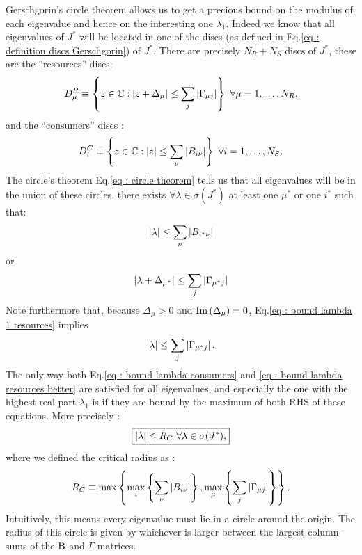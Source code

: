 \documentclass[12pt, titlepage]{report}
\begin{document}
Gerschgorin's circle theorem allows us to get a precious bound on the modulus of each eigenvalue and hence on the interesting one $\lambda_1$. Indeed we know that all eigenvalues of $J^*$ will be located in one of the discs (as defined in Eq.\eqref{eq : definition discs Gerschgorin}) of $J^*$. There are precisely $N_R + N_S$ discs of $J^*$, these are the ``resources'' discs:
\begin{equation}
D^R_\mu  \equiv \left\{ z \in \mathbb{C} : \left|{z+\Delta_\mu}\right| \leq \sum_j \left|{\Gamma_{\mu j}}\right| \right\}  \ \forall \mu = 1, \dots, N_R,
\end{equation}
and the ``consumers'' discs :
\begin{equation}
D^C_i \equiv \left\{ z \in \mathbb{C} : \left|{z}\right| \leq \sum_\nu \left|{B_{i\nu}}\right|\right\} \ \forall i=1, \dots, N_S.
\end{equation}
The circle's theorem Eq.\eqref{eq : circle theorem} tells us that all eigenvalues will be in the union of these circles, \ie there exists $\forall \lambda \in \sigma\left(J^*\right)$ at least one $\mu^*$ or  one $i^*$ such that:
\begin{equation}
\left|{\lambda}\right| \leq \sum_\nu \left|{B_{i^*\nu}}\right| \label{eq : bound lambda consumers}
\end{equation}
or
\begin{equation}
\left|{\lambda+\Delta_{\mu^*}}\right| \leq \sum_j \left|{\Gamma_{\mu^* j}}\right| \label{eq : bound lambda 1 resources}
\end{equation}
Note furthermore that, because $\Delta_\mu > 0$ and $\text{Im}\left(\Delta_\mu\right)=0$, Eq.\eqref{eq : bound lambda 1 resources} implies
\begin{equation}
\left|{\lambda}\right| \leq \sum_j \left|{\Gamma_{\mu^* j}}\right|. \label{eq : bound lambda resources better}
\end{equation}
The only way both Eq.\eqref{eq : bound lambda consumers} and \eqref{eq : bound lambda resources better} are satisfied for all eigenvalues, and especially the one with the highest real part $\lambda_1$ is if they are bound by the maximum of both RHS of these equations. More precisely :
\begin{equation}
\boxed{
\left|{\lambda}\right| \leq R_C \ \forall \lambda \in \sigma(J^*), \label{eq : overall bound on lambda}
}
\end{equation}
where we defined the critical radius as :
\begin{equation}
R_C \equiv \max\left\{\max_i\left\{\sum_\nu \left|{B_{i\nu}}\right|\right\}, \max_\mu\left\{\sum_j \left|{\Gamma_{\mu j}}\right|\right\}\right\}.
\end{equation}
Intuitively, this means every eigenvalue must lie in a circle around the origin. The radius of this circle is given by whichever is larger between the largest column-sums of the $\text{B}$ and $\Gamma$ matrices.
\end{document}
